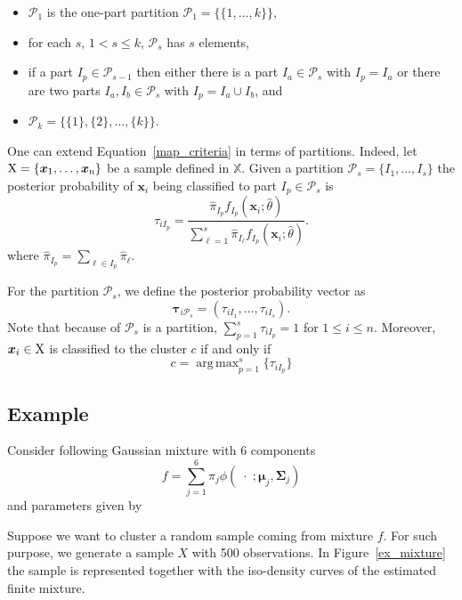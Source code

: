 \documentclass[10pt, a4paper]{article}
\DeclareMathOperator*{\argmax}{arg\,max}
\newcommand{\m}[1]{\boldsymbol{#1}}
\begin{document}
\begin{spacing}{1.9}
\begin{itemize}
\item $\mathcal{P}_1$ is the one-part partition $\mathcal{P}_1 = \{ \{1, \dots, k\} \}$,
\item for each $s$, $1 <  s \leq k$, $\mathcal{P}_{s}$ has $s$ elements,
\item if a part $I_p \in \mathcal{P}_{s-1}$ then either there is a part $I_a \in \mathcal{P}_{s}$ with $I_p = I_a$ or there are two parts $I_a, I_b \in \mathcal{P}_s$ with $I_p = I_a \cup I_b$, and
\item $\mathcal{P}_k= \{ \{1\},\{2\}, \dots, \{k\} \}$.
\end{itemize}



One can extend Equation~\ref{map_criteria} in terms of partitions. Indeed, let $\rm X = \{\m x_1,\dots, \m x_n\}$ be a sample defined in $\mathbb{X}$. Given a partition $\mathcal{P}_s = \{ I_1, \dots, I_s \}$ the posterior probability of $\m x_i$ being classified to part $I_p\in \mathcal{P}_{s}$ is
\[
\tau_{i I_p} =  \frac{ \hat{\pi}_{I_p} f_{I_p}(\m x_i; \hat{\theta}) }{\sum_{\ell=1}^s \hat{\pi}_{I_\ell} f_{I_p}(\m x_i; \hat{\theta})}.
\]
where $\hat{\pi}_{I_p} = \sum_{\ell \in I_p} \hat{\pi}_\ell$. %

For the partition  $\mathcal{P}_s$, we define the posterior probability vector as
\begin{equation}\label{ppv}
\m\tau_{i \mathcal{P}_s} = \left(\tau_{i I_1} , \dots, \tau_{i I_s}  \right).
\end{equation}
Note that because of $\mathcal{P}_s$ is a partition, $\sum_{p=1}^s \tau_{i I_p} = 1$ for $1 \leq i \leq n$.
Moreover, $\m x_i \in \rm X$ is classified to the cluster $c$ if and only if
\begin{equation}\label{cluster_criteria}
c= \argmax_{p=1}^s \{ \tau_{i I_p} \}
\end{equation}

\subsection{Example}

Consider following Gaussian mixture with 6 components
\[
f= \sum_{j=1}^6 \pi_j \phi(\;\cdot\; ;  \m\mu_j, \m\Sigma_j)
\]
and parameters given by
{\small  }

Suppose we want to cluster a random sample coming from mixture $f$. For such purpose, we generate a sample $X$ with 500 observations. In  Figure~\ref{ex_mixture} the sample is represented together with the iso-density curves of the estimated finite mixture.


\end{spacing}
\end{document}
